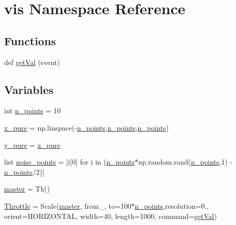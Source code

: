 \hypertarget{namespacevis}{}\section{vis Namespace Reference}
\label{namespacevis}
\subsection*{Functions}
\begin{DoxyCompactItemize}
\item 
def \hyperlink{namespacevis_a987b76332d0d03b66af97331e5e4b442}{get\+Val} (event)
\end{DoxyCompactItemize}
\subsection*{Variables}
\begin{DoxyCompactItemize}
\item 
int \hyperlink{namespacevis_a670f391917319e53a1373004ad47a325}{n\+\_\+points} = 10
\item 
\hyperlink{namespacevis_a4086117aa0dbd872a99b2f3738d56ae6}{x\+\_\+pure} = np.\+linspace(-\/\hyperlink{namespacevis_a670f391917319e53a1373004ad47a325}{n\+\_\+points},\hyperlink{namespacevis_a670f391917319e53a1373004ad47a325}{n\+\_\+points},\hyperlink{namespacevis_a670f391917319e53a1373004ad47a325}{n\+\_\+points})
\item 
\hyperlink{namespacevis_ac14aca4ab4de023eb6759df589da3396}{y\+\_\+pure} = \hyperlink{namespacevis_a4086117aa0dbd872a99b2f3738d56ae6}{x\+\_\+pure}
\item 
list \hyperlink{namespacevis_ac930396acd65d715184cfd4ae2df301c}{noise\+\_\+points} = \mbox{[}i\mbox{[}0\mbox{]} for i in (\hyperlink{namespacevis_a670f391917319e53a1373004ad47a325}{n\+\_\+points}$\ast$np.\+random.\+rand(\hyperlink{namespacevis_a670f391917319e53a1373004ad47a325}{n\+\_\+points},1) -\/ \hyperlink{namespacevis_a670f391917319e53a1373004ad47a325}{n\+\_\+points}/2)\mbox{]}
\item 
\hyperlink{namespacevis_a6ee13a8bd702057064f342e00fe8eefd}{master} = Tk()
\item 
\hyperlink{namespacevis_a294e676e5dc073fa5ddcea9955943af9}{Throttle} = Scale(\hyperlink{namespacevis_a6ee13a8bd702057064f342e00fe8eefd}{master}, from\+\_, to=100$\ast$\hyperlink{namespacevis_a670f391917319e53a1373004ad47a325}{n\+\_\+points},resolution=0., orient=H\+O\+R\+I\+Z\+O\+N\+T\+AL, width=40, length=1000, command=\hyperlink{namespacevis_a987b76332d0d03b66af97331e5e4b442}{get\+Val})
\end{DoxyCompactItemize}


